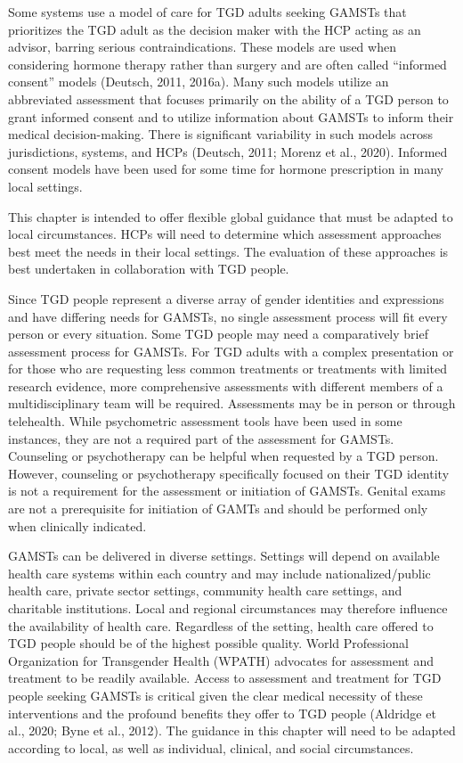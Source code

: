 \documentclass[
]{book}
\begin{document}
Some systems use a model of care for TGD
adults seeking GAMSTs that prioritizes the TGD
adult as the decision maker with the HCP acting
as an advisor, barring serious contraindications.
These models are used when considering hormone therapy rather than surgery and are often
called ``informed consent'' models (Deutsch, 2011,
2016a). Many such models utilize an abbreviated
assessment that focuses primarily on the ability
of a TGD person to grant informed consent and
to utilize information about GAMSTs to inform
their medical decision-making. There is significant variability in such models across jurisdictions, systems, and HCPs (Deutsch, 2011; Morenz
et al., 2020). Informed consent models have been
used for some time for hormone prescription in
many local settings.

This chapter is intended to offer flexible global
guidance that must be adapted to local circumstances. HCPs will need to determine which
assessment approaches best meet the needs in
their local settings. The evaluation of these
approaches is best undertaken in collaboration
with TGD people.

Since TGD people represent a diverse array of
gender identities and expressions and have differing needs for GAMSTs, no single assessment
process will fit every person or every situation.
Some TGD people may need a comparatively
brief assessment process for GAMSTs. For TGD
adults with a complex presentation or for those
who are requesting less common treatments or
treatments with limited research evidence, more
comprehensive assessments with different members of a multidisciplinary team will be required.
Assessments may be in person or through telehealth. While psychometric assessment tools have
been used in some instances, they are not a
required part of the assessment for GAMSTs.
Counseling or psychotherapy can be helpful when
requested by a TGD person. However, counseling
or psychotherapy specifically focused on their
TGD identity is not a requirement for the assessment or initiation of GAMSTs. Genital exams are
not a prerequisite for initiation of GAMTs and
should be performed only when clinically
indicated.

GAMSTs can be delivered in diverse settings.
Settings will depend on available health care systems within each country and may include nationalized/public health care, private sector settings,
community health care settings, and charitable
institutions. Local and regional circumstances may
therefore influence the availability of health care.
Regardless of the setting, health care offered to
TGD people should be of the highest possible
quality. World Professional Organization for
Transgender Health (WPATH) advocates for
assessment and treatment to be readily available.
Access to assessment and treatment for TGD
people seeking GAMSTs is critical given the clear
medical necessity of these interventions and the
profound benefits they offer to TGD people
(Aldridge et al., 2020; Byne et al., 2012). The guidance in this chapter will need to be adapted
according to local, as well as individual, clinical,
and social circumstances.
\end{document}
